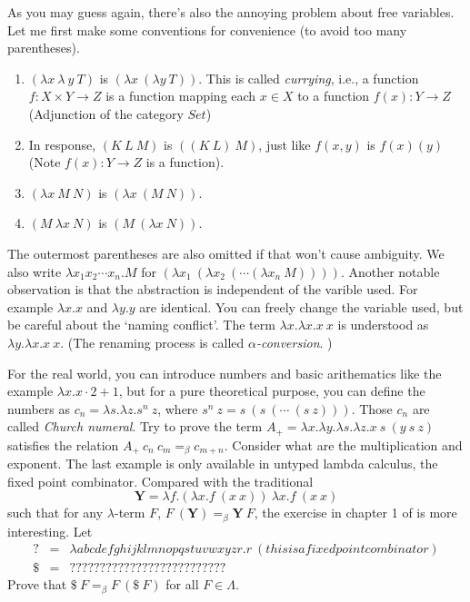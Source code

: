 As you may guess again, there's also the annoying problem about free
variables. Let me first make some conventions for convenience (to
avoid too many parentheses). 
\begin{enumerate}
    \item $(\lambda x\ \lambda\ y\ T)$ is $(\lambda x\ (\lambda y\ T))$.
    This is called {\it currying}, i.e., a function $f: X\times Y\to Z$ is
    a function mapping each $x\in X$ to a function $f(x): Y\to Z$ 
    (Adjunction of the category $Set$)
    \item In response, $(K\ L\ M)$ is $((K\ L)\ M)$, just like $f(x, y)$
    is $f(x)(y)$ (Note $f(x): Y\to Z$ is a function). 
    \item $(\lambda x\ M\ N)$ is $(\lambda x\ (M\ N))$.
    \item $(M\ \lambda x\ N)$ is $(M\ (\lambda x\ N))$.
\end{enumerate}

The outermost parentheses are also omitted if that won't cause ambiguity.
We also write $\lambda x_1 x_2\cdots x_n.M$ for 
$(\lambda x_1\ (\lambda x_2\ (\cdots(\lambda x_n\ M))))$. Another notable
observation is that the abstraction is independent of the varible used.
For example $\lambda x.x$ and $\lambda y.y$ are identical. You can freely
change the variable used, but be careful about the `naming conflict'. 
The term $\lambda x. \lambda x. x\ x$ is understood as 
$\lambda y. \lambda x. x\ x$. (The renaming process is called {\it
$\alpha$-conversion}. )

For the real world, you can introduce numbers and basic arithematics like
the example $\lambda x. x \cdot 2 + 1$, but for a pure theoretical 
purpose, you can define the numbers as $c_n=\lambda s.\lambda z. s^n\ z$, 
where $s^n\ z = s\ (s\ (\cdots\ (s\ z)))$. Those $c_n$ are called {\it
Church numeral}. Try to prove the term $A_+=\lambda x.\lambda y.\lambda s
.\lambda z.x\ s\ (y\ s\ z)$ satisfies the relation 
$A_+\ c_n\ c_m=_\beta c_{m+n}$. Consider what are the multiplication and 
exponent. The last example is only available in untyped lambda calculus,
the fixed point combinator. Compared with the traditional 
$$\mathbf{Y} = \lambda f.(\lambda x.f\ (x\ x))\ \lambda x.f\ (x\ x)$$
such that for any $\lambda$-term $F$, 
$F\ (\mathbf{Y})=_\beta \mathbf{Y}\ F$, the exercise in chapter 1 of 
\cite{Curry-Howard} is more interesting. Let
$$
\begin{array}{lll}
    ? &=& \lambda abcdefghijklmnopqstuvwxyzr.r\ (thisisafixedpointcombinator) \\
    \$ &=& ??????????????????????????
\end{array}
$$
Prove that $\$\ F=_\beta F\ (\$\ F)$ for all $F\in\Lambda$.

